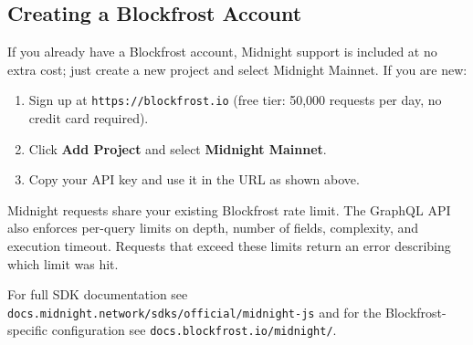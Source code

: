 \subsection*{Creating a Blockfrost Account}

If you already have a Blockfrost account, Midnight support is included at no extra cost; just create a new project and select Midnight Mainnet. If you are new:

\begin{enumerate}
  \item Sign up at \texttt{https://blockfrost.io} (free tier: 50,000 requests per day, no credit card required).
  \item Click \textbf{Add Project} and select \textbf{Midnight Mainnet}.
  \item Copy your API key and use it in the URL as shown above.
\end{enumerate}

\begin{highlight}
Midnight requests share your existing Blockfrost rate limit. The GraphQL API also enforces per-query limits on depth, number of fields, complexity, and execution timeout. Requests that exceed these limits return an error describing which limit was hit.
\end{highlight}

For full SDK documentation see \texttt{docs.midnight.network/sdks/official/midnight-js} and for the Blockfrost-specific configuration see \texttt{docs.blockfrost.io/midnight/}.
